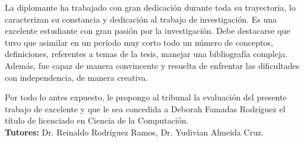 \begin{opinion}
La diplomante ha trabajado con gran dedicación durante toda su trayectoria, lo caracterizan su constancia y dedicación al trabajo de investigación. Es una excelente estudiante con gran pasión por la investigación. Debe destacarse que tuvo que asimilar en un período muy corto todo un número de conceptos, definiciones, referentes a temas de la tesis, manejar una bibliografía compleja. Además, fue capaz de manera convincente y resuelta de enfrentar las dificultades con independencia, de manera creativa.

Por todo lo antes expuesto, le propongo al tribunal la evaluación del presente trabajo de excelente y que le sea concedida a Deborah Famadas Rodríguez el título de licenciado en Ciencia de la Computación. \\

\textbf{Tutores:} Dr. Reinaldo Rodríguez Ramos,
Dr. Yudivian Almeida Cruz.

\end{opinion}